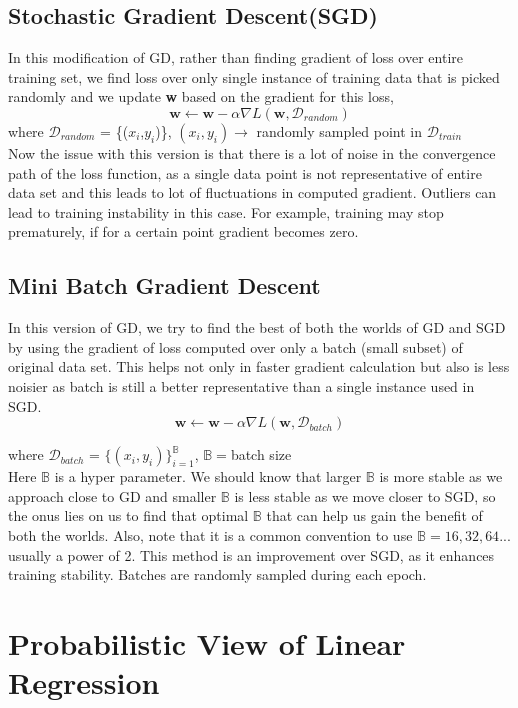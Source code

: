 \documentclass{report}
\newcommand{\D}{\mathcal{D}}
\begin{document}
\subsection{Stochastic Gradient Descent(SGD)}

In this modification of GD, rather than finding gradient of loss over entire training set, we find loss over only single instance of training data that is picked randomly and we update \textbf{w} based on the gradient for this loss,
$$\textbf{w} \leftarrow \textbf{w} - \alpha \nabla L(\textbf{w}, \D_{random})$$
where $\D_{random}$ = \{($x_{i}$,$y_{i}$)\}, $(x_{i},y_{i}) \rightarrow$ randomly sampled point in $\D_{train}$\\
Now the issue with this version is that there is a lot of noise in the convergence path of the loss function, as a single data point is not representative of entire data set and this leads to lot of fluctuations in computed gradient. Outliers can lead to training instability in this
case. For example, training may stop prematurely, if for a certain point gradient becomes
zero.

\subsection{Mini Batch Gradient Descent}
In this version of GD, we try to find the best of both the worlds of GD and SGD by using the gradient of loss computed over only a batch (small subset) of original data set. This helps not only in faster gradient calculation but also is less noisier as batch is still a better representative than a single instance used in SGD.
$$
  \textbf{w} \leftarrow \textbf{w} - \alpha \nabla L(\textbf{w}, \D_{batch})
$$

where $\D_{batch}$ = $\{(x_{i},y_{i})\}_{i = 1}^{\mathbb{B}}$, $\mathbb{B} = $batch size\\
Here $\mathbb{B}$ is a hyper parameter. We should know that larger $\mathbb{B}$ is more stable as we approach close to GD and smaller $\mathbb{B}$ is less stable as we move closer to SGD, so the onus lies on us to find that optimal $\mathbb{B}$ that can help us gain the benefit of both the worlds. Also, note that it is a common convention to use $\mathbb{B} = 16,32,64 ...$ usually a power of 2. This method is an improvement over SGD, as it enhances training
stability. Batches are randomly sampled during each epoch.

\section{Probabilistic View of Linear Regression}
\end{document}
